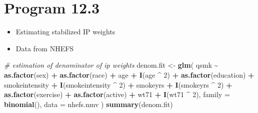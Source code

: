 \documentclass[
  10pt,
]{book}
\newenvironment{Shaded}{\begin{snugshade}}{\end{snugshade}}
\newcommand{\CommentTok}[1]{\textcolor[rgb]{0.56,0.35,0.01}{\textit{#1}}}
\newcommand{\DataTypeTok}[1]{\textcolor[rgb]{0.13,0.29,0.53}{#1}}
\newcommand{\DecValTok}[1]{\textcolor[rgb]{0.00,0.00,0.81}{#1}}
\newcommand{\KeywordTok}[1]{\textcolor[rgb]{0.13,0.29,0.53}{\textbf{#1}}}
\newcommand{\NormalTok}[1]{#1}
\newcommand{\OperatorTok}[1]{\textcolor[rgb]{0.81,0.36,0.00}{\textbf{#1}}}
\newcommand{\StringTok}[1]{\textcolor[rgb]{0.31,0.60,0.02}{#1}}
\providecommand{\tightlist}{%
  \setlength{\itemsep}{0pt}\setlength{\parskip}{0pt}}
\begin{document}
\hypertarget{program-12.3}{%
\section{Program 12.3}\label{program-12.3}}

\begin{itemize}
\tightlist
\item
  Estimating stabilized IP weights
\item
  Data from NHEFS
\end{itemize}

\begin{Shaded}
\begin{Highlighting}[]
\CommentTok{\# estimation of denominator of ip weights}
\NormalTok{denom.fit \textless{}{-}}
\StringTok{  }\KeywordTok{glm}\NormalTok{(}
\NormalTok{    qsmk }\OperatorTok{\textasciitilde{}}\StringTok{ }\KeywordTok{as.factor}\NormalTok{(sex) }\OperatorTok{+}\StringTok{ }\KeywordTok{as.factor}\NormalTok{(race) }\OperatorTok{+}\StringTok{ }\NormalTok{age }\OperatorTok{+}\StringTok{ }\KeywordTok{I}\NormalTok{(age }\OperatorTok{\^{}}\StringTok{ }\DecValTok{2}\NormalTok{) }\OperatorTok{+}
\StringTok{      }\KeywordTok{as.factor}\NormalTok{(education) }\OperatorTok{+}\StringTok{ }\NormalTok{smokeintensity }\OperatorTok{+}
\StringTok{      }\KeywordTok{I}\NormalTok{(smokeintensity }\OperatorTok{\^{}}\StringTok{ }\DecValTok{2}\NormalTok{) }\OperatorTok{+}\StringTok{ }\NormalTok{smokeyrs }\OperatorTok{+}\StringTok{ }\KeywordTok{I}\NormalTok{(smokeyrs }\OperatorTok{\^{}}\StringTok{ }\DecValTok{2}\NormalTok{) }\OperatorTok{+}
\StringTok{      }\KeywordTok{as.factor}\NormalTok{(exercise) }\OperatorTok{+}\StringTok{ }\KeywordTok{as.factor}\NormalTok{(active) }\OperatorTok{+}\StringTok{ }\NormalTok{wt71 }\OperatorTok{+}\StringTok{ }\KeywordTok{I}\NormalTok{(wt71 }\OperatorTok{\^{}}\StringTok{ }\DecValTok{2}\NormalTok{),}
    \DataTypeTok{family =} \KeywordTok{binomial}\NormalTok{(),}
    \DataTypeTok{data =}\NormalTok{ nhefs.nmv}
\NormalTok{  )}
\KeywordTok{summary}\NormalTok{(denom.fit)}
\end{Highlighting}
\end{Shaded}
\end{document}
